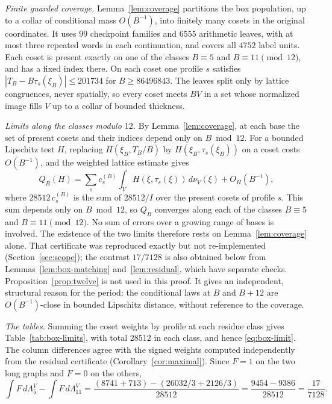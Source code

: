 \documentclass[11pt,reqno]{amsart}
\theoremstyle{remark}
\begin{document}
\emph{Finite guarded coverage.} Lemma~\ref{lem:coverage} partitions the box population, up to a collar of conditional mass \(O(B^{-1})\), into finitely many cosets in the original coordinates. It uses \(99\) checkpoint families and \(6555\) arithmetic leaves, with at most three repeated words in each continuation, and covers all \(4752\) label units. Each coset is present exactly on one of the classes \(B\equiv5\) and \(B\equiv11\pmod{12}\), and has a fixed index there. On each coset one profile \(s\) satisfies \(|T_B-B\tau_s(\xi_B)|\le201734\) for \(B\ge86496843\). The leaves split only by lattice congruences, never spatially, so every coset meets \(BV\) in a set whose normalized image fills \(V\) up to a collar of bounded thickness.

\emph{Limits along the classes modulo \(12\).} By Lemma~\ref{lem:coverage}, at each base the set of present cosets and their indices depend only on \(B\bmod12\). For a bounded Lipschitz test \(H\), replacing \(H(\xi_B,T_B/B)\) by \(H(\xi_B,\tau_s(\xi_B))\) on a coset costs \(O(B^{-1})\), and the weighted lattice estimate gives
\[
 Q_B(H)=\sum_s c^{(B)}_s\int_V H(\xi,\tau_s(\xi))\,d\nu_V(\xi)+O_H(B^{-1}),
\]
where \(28512\,c^{(B)}_s\) is the sum of \(28512/I\) over the present cosets of profile \(s\). This sum depends only on \(B\bmod 12\), so \(Q_B\) converges along each of the classes \(B\equiv5\) and \(B\equiv11\pmod{12}\). No sum of errors over a growing range of bases is involved. The existence of the two limits therefore rests on Lemma~\ref{lem:coverage} alone. That certificate was reproduced exactly but not re-implemented (Section~\ref{sec:scope}); the contrast \(17/7128\) is also obtained below from Lemmas~\ref{lem:box-matching} and~\ref{lem:residual}, which have separate checks. Proposition~\ref{prop:twelve} is not used in this proof. It gives an independent, structural reason for the period: the conditional laws at \(B\) and \(B+12\) are \(O(B^{-1})\)-close in bounded Lipschitz distance, without reference to the coverage.

\emph{The tables.} Summing the coset weights by profile at each residue class gives Table~\ref{tab:box-limits}, with total \(28512\) in each class, and hence \eqref{eq:box-limit}. The column differences agree with the signed weights computed independently from the residual certificate (Corollary~\ref{cor:maximal}). Since \(F=1\) on the two long graphs and \(F=0\) on the others,
\[
 \int F\,d\Lambda^V_5-\int F\,d\Lambda^V_{11}
 =\frac{(8741+713)-(26032/3+2126/3)}{28512}=\frac{9454-9386}{28512}=\frac{17}{7128}.
\]
\end{document}
